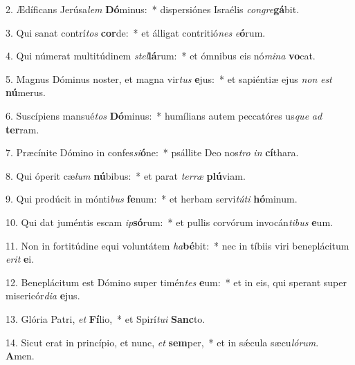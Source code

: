 2. Ædíficans Jerúsa\textit{lem} \textbf{Dó}minus:~*  dispersiónes Israélis \textit{con}\textit{gre}\textbf{gá}bit.\

3. Qui sanat contrí\textit{tos} \textbf{cor}de:~*  et álligat contritió\textit{nes} \textit{e}\textbf{ó}rum.\

4. Qui númerat multitúdinem \textit{stel}\textbf{lá}rum:~*  et ómnibus eis nó\textit{mi}\textit{na} \textbf{vo}cat.\

5. Magnus Dóminus noster, et magna vir\textit{tus} \textbf{e}jus:~*  et sapiéntiæ ejus \textit{non} \textit{est} \textbf{nú}merus.\

6. Suscípiens mansué\textit{tos} \textbf{Dó}minus:~*  humílians autem peccatóres us\textit{que} \textit{ad} \textbf{ter}ram.\

7. Præcínite Dómino in confes\textit{si}\textbf{ó}ne:~*  psállite Deo nos\textit{tro} \textit{in} \textbf{cí}thara.\

8. Qui óperit cæ\textit{lum} \textbf{nú}bibus:~*  et parat \textit{ter}\textit{ræ} \textbf{plú}viam.\

9. Qui prodúcit in mónti\textit{bus} \textbf{fe}num:~*  et herbam servi\textit{tú}\textit{ti} \textbf{hó}minum.\

10. Qui dat juméntis escam \textit{ip}\textbf{só}rum:~*  et pullis corvórum invocán\textit{ti}\textit{bus} \textbf{e}um.\

11. Non in fortitúdine equi voluntátem \textit{ha}\textbf{bé}bit:~*  nec in tíbiis viri beneplácitum \textit{e}\textit{rit} \textbf{e}i.\

12. Beneplácitum est Dómino super timén\textit{tes} \textbf{e}um:~*  et in eis, qui sperant super misericór\textit{di}\textit{a} \textbf{e}jus.\

13. Glória Patri, \textit{et} \textbf{Fí}lio,~*  et Spirí\textit{tu}\textit{i} \textbf{Sanc}to.\

14. Sicut erat in princípio, et nunc, \textit{et} \textbf{sem}per,~*  et in sǽcula sæcu\textit{ló}\textit{rum}. \textbf{A}men.\

